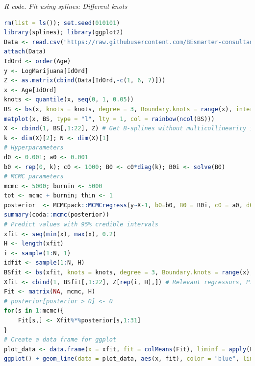 \begin{tcolorbox}[enhanced,width=4.67in,center upper,
	fontupper=\large\bfseries,drop shadow southwest,sharp corners]
	\textit{R code. Fit using splines: Different knots}
	\begin{VF}
		\begin{lstlisting}[language=R]
rm(list = ls()); set.seed(010101)
library(splines); library(ggplot2)
Data <- read.csv("https://raw.githubusercontent.com/BEsmarter-consultancy/BSTApp/refs/heads/master/DataApp/MarijuanaColombia.csv")
attach(Data)
IdOrd <- order(Age) 
y <- LogMarijuana[IdOrd]
Z <- as.matrix(cbind(Data[IdOrd,-c(1, 6, 7)]))
x <- Age[IdOrd] 
knots <- quantile(x, seq(0, 1, 0.05))
BS <- bs(x, knots = knots, degree = 3, Boundary.knots = range(x), intercept = FALSE)
matplot(x, BS, type = "l", lty = 1, col = rainbow(ncol(BS)))
X <- cbind(1, BS[,1:22], Z) # Get B-splines without multicollinearity issues
k <- dim(X)[2]; N <- dim(X)[1]
# Hyperparameters
d0 <- 0.001; a0 <- 0.001
b0 <- rep(0, k); c0 <- 1000; B0 <- c0*diag(k); B0i <- solve(B0)
# MCMC parameters
mcmc <- 5000; burnin <- 5000
tot <- mcmc + burnin; thin <- 1
posterior  <- MCMCpack::MCMCregress(y~X-1, b0=b0, B0 = B0i, c0 = a0, d0 = d0, burnin = burnin, mcmc = mcmc, thin = thin)
summary(coda::mcmc(posterior))
# Predict values with 95% credible intervals
xfit <- seq(min(x), max(x), 0.2)
H <- length(xfit)
i <- sample(1:N, 1)
idfit <- sample(1:N, H)
BSfit <- bs(xfit, knots = knots, degree = 3, Boundary.knots = range(x), intercept = FALSE)
Xfit <- cbind(1, BSfit[,1:22], Z[rep(i, H),]) # Relevant regressors, PIP > 0.5
Fit <- matrix(NA, mcmc, H)
# posterior[posterior > 0] <- 0
for(s in 1:mcmc){
	Fit[s,] <- Xfit%*%posterior[s,1:31]
}
# Create a data frame for ggplot
plot_data <- data.frame(x = xfit, fit = colMeans(Fit), liminf = apply(Fit, 2, quantile, 0.025), limsup = apply(Fit, 2, quantile, 0.975))
ggplot() + geom_line(data = plot_data, aes(x, fit), color = "blue", linewidth = 1) + geom_ribbon(data = plot_data, aes(x, ymin = liminf, ymax = limsup), fill = "blue", alpha = 0.2) + labs(title = "B-Spline Regression with 95% Confidence Interval", x = "Age", y = "Log Marijuana") + theme_minimal()
\end{lstlisting}
	\end{VF}
\end{tcolorbox}

